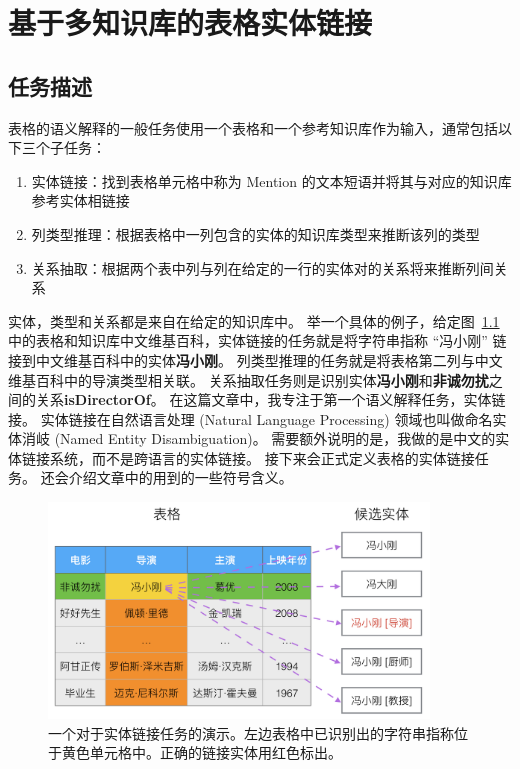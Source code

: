 \chapter{基于多知识库的表格实体链接}

\section{任务描述}\label{2.1}

表格的语义解释的一般任务使用一个表格和一个参考知识库作为输入，通常包括以下三个子任务：

\begin{enumerate}[1.]
\item 实体链接：找到表格单元格中称为 Mention 的文本短语并将其与对应的知识库参考实体相链接
\item 列类型推理：根据表格中一列包含的实体的知识库类型来推断该列的类型
\item 关系抽取：根据两个表中列与列在给定的一行的实体对的关系将来推断列间关系
\end{enumerate}

实体，类型和关系都是来自在给定的知识库中。
举一个具体的例子，给定图~\ref{movie} 中的表格和知识库中文维基百科，实体链接的任务就是将字符串指称 ``冯小刚'' 链接到中文维基百科中的实体\textbf{冯小刚}。
列类型推理的任务就是将表格第二列与中文维基百科中的导演类型相关联。
关系抽取任务则是识别实体\textbf{冯小刚}和\textbf{非诚勿扰}之间的关系\textbf{isDirectorOf}。
在这篇文章中，我专注于第一个语义解释任务，实体链接。
实体链接在自然语言处理 (Natural Language Processing) 领域也叫做命名实体消岐 (Named Entity Disambiguation)。
需要额外说明的是，我做的是中文的实体链接系统，而不是跨语言的实体链接\cite{zhang2013cross}。
接下来会正式定义表格的实体链接任务。
还会介绍文章中的用到的一些符号含义。\newline\par

\begin{figure}[htbp]
\centering
\includegraphics[width=0.9\textwidth]{img/movie}
\caption{一个对于实体链接任务的演示。左边表格中已识别出的字符串指称位于黄色单元格中。正确的链接实体用红色标出。}
\label{movie}
\end{figure}

